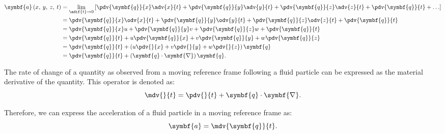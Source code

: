 \documentclass{article}
\theoremstyle{definition}
\begin{document}
\begin{align*}
    \symbf{a}\left( x,\: y,\: z,\: t \right) & = \lim_{\adif{t} \to 0} \left[ \pdv{\symbf{q}}{x} \adv{x}{t} + \pdv{\symbf{q}}{y} \adv{y}{t} + \pdv{\symbf{q}}{z} \adv{z}{t} + \pdv{\symbf{q}}{t} + \ldots \right] \\
                                             & = \pdv{\symbf{q}}{x} \odv{x}{t} + \pdv{\symbf{q}}{y} \odv{y}{t} + \pdv{\symbf{q}}{z} \odv{z}{t} + \pdv{\symbf{q}}{t}                                               \\
                                             & = \pdv{\symbf{q}}{x} u + \pdv{\symbf{q}}{y} v + \pdv{\symbf{q}}{z} w + \pdv{\symbf{q}}{t}                                                                          \\
                                             & = \pdv{\symbf{q}}{t} + u \pdv{\symbf{q}}{x} + v \pdv{\symbf{q}}{y} + w \pdv{\symbf{q}}{z}                                                                          \\
                                             & = \pdv{\symbf{q}}{t} + \left( u \pdv{}{x} + v \pdv{}{y} + w \pdv{}{z} \right) \symbf{q}                                                                            \\
                                             & = \pdv{\symbf{q}}{t} + \left( \symbf{q} \cdot \symbf{\nabla} \right) \symbf{q}.
\end{align*}
\begin{definition}
    The rate of change of a quantity as observed from a moving reference
    frame following a fluid particle can be expressed as the material
    derivative of the quantity. This operator is denoted as:
    \begin{equation*}
        \mdv{}{t} = \pdv{}{t} + \symbf{q} \cdot \symbf{\nabla}.
    \end{equation*}
\end{definition}
Therefore, we can express the acceleration of a fluid particle in a
moving reference frame as:
\begin{equation*}
    \symbf{a} = \mdv{\symbf{q}}{t}.
\end{equation*}
\end{document}
